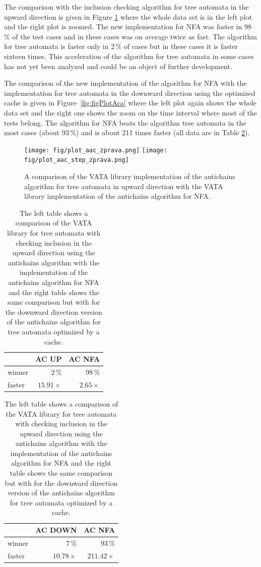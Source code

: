 The comparison with the inclusion checking algorithm for tree automata in the upward direction is given in Figure \ref{fig:figPlotAac} where the whole data
set is in the left plot and the right plot is zoomed. The new implementation for NFA was faster in 98\,\% of the
test cases and in these cases was on average twice as fast. The algorithm for tree automata is faster only in 2\,\% of cases 
but in these cases it is faster sixteen times.
This acceleration of the algorithm for tree automata in some cases has not yet been analyzed and could be an object of further development.

The comparison of the new implementation of the algorithm for NFA with the implementation for tree automata in the downward direction using the optimized cache
is given in Figure~\ref{fig:figPlotAca} 
where the left plot again shows the whole data set and the right one shows the zoom on the time interval where most of the tests belong.
The algorithm for NFA beats the algorithm tree automata in the most cases (about 93\,\%) and is about 211 times faster (all data are in Table \ref{tabAac}).
\begin{figure}[bt]
\begin{center}
\texttt{[image: fig/plot\_aac\_zprava.png]}
\texttt{[image: fig/plot\_aac\_step\_zprava.png]}
\caption{A comparison of the VATA library implementation of the antichains algorithm for tree automata in upward direction
    with the VATA library implementation of the antichains algorithm for NFA.}
\label{fig:figPlotAac}
\end{center}
\end{figure}
\begin{table}[bt]
\begin{center}
\parbox{.45\linewidth}{
  \begin{tabular}[scale=0.3]{ | l | r | r |}
   \hline
    & \textbf{AC UP} & \textbf{AC NFA} \\ \hline \hline
    winner & $2\,\%$ & $98\,\%$ \\ \hline
    faster & $15.91\times$ & $2.65\times$ \\ \hline
   \end{tabular}
}
   \parbox{.45\linewidth}{
  \begin{tabular}{ | l | r | r |}
   \hline
    & \textbf{AC DOWN} & \textbf{AC NFA} \\ \hline \hline
    winner & $7\,\%$ & $93\,\%$ \\ \hline
    faster & $10.78\times$ & $211.42\times$ \\ \hline
   \end{tabular}
   }
   \caption{The left table shows a comparison of the VATA library for tree automata with checking inclusion in the 
     upward direction using the antichains algorithm with the implementation of the antichains algorithm for NFA and
   the right table shows the same comparison but with for the downward direction version of the antichains algorithm for tree automata optimized
   by a cache.}
   \label{tabAac}
\end{center}
\end{table}
